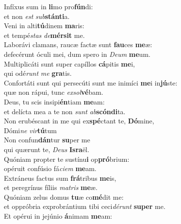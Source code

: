 \evenverse Infíxus sum in \textbf{li}mo pro\textbf{fún}di:~\*\\
\evenverse et non \textit{est} \textit{sub}\textbf{stán}\textbf{ti}a.\\
\oddverse Veni in alti\textbf{tú}dinem \textbf{ma}ris:~\*\\
\oddverse et tempé\textit{stas} \textit{de}\textbf{mér}\textbf{sit} me.\\
\evenverse Laborávi clamans, raucæ factæ sunt \textbf{fau}ces \textbf{me}æ:~\*\\
\evenverse defecérunt óculi mei, dum spero in \textit{De}\textit{um} \textbf{me}um.\\
\oddverse Multiplicáti sunt super capíllos \textbf{cá}pitis \textbf{me}i,~\*\\
\oddverse qui odé\textit{runt} \textit{me} \textbf{gra}tis.\\
\evenverse Confortáti sunt qui persecúti sunt me inimíci \textbf{me}i in\textbf{jú}ste:~\*\\
\evenverse quæ non rápui, tunc \textit{ex}\textit{sol}\textbf{vé}bam.\\
\oddverse Deus, tu scis insipi\textbf{én}tiam \textbf{me}am:~\*\\
\oddverse et delícta mea a te non \textit{sunt} \textit{ab}\textbf{scón}\textbf{di}ta.\\
\evenverse Non erubéscant in me qui ex\textbf{spé}ctant te, \textbf{Dó}mine,~\*\\
\evenverse Dómi\textit{ne} \textit{vir}\textbf{tú}tum\\
\oddverse Non confun\textbf{dán}tur \textbf{su}per me~\*\\
\oddverse qui quærunt te, \textit{De}\textit{us} \textbf{Is}\textbf{ra}ël.\\
\evenverse Quóniam propter te sustínu\textbf{i} op\textbf{pró}brium:~\*\\
\evenverse opéruit confúsio fá\textit{ci}\textit{em} \textbf{me}am.\\
\oddverse Extráneus factus sum \textbf{frá}tribus \textbf{me}is,~\*\\
\oddverse et peregrínus fíliis \textit{ma}\textit{tris} \textbf{me}æ.\\
\evenverse Quóniam zelus domus \textbf{tu}æ co\textbf{mé}dit me:~\*\\
\evenverse et oppróbria exprobrántium tibi ceci\textit{dé}\textit{runt} \textbf{su}\textbf{per} me.\\
\oddverse Et opérui in jejúnio \textbf{á}nimam \textbf{me}am:~\*\\
